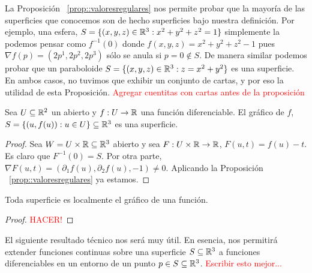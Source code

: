 \begin{ex}
La Proposición ~\ref{prop::valoresregulares} nos permite probar que la mayoría de las superficies que conocemos son de hecho superficies bajo nuestra definición. Por ejemplo, una esfera, $S=\{(x,y,z)\in\mathbb{R}^3 : x^2+y^2+z^2 =1\}$ simplemente la podemos pensar como $f^{-1}(0)$ donde $f(x,y,z)=x^2+y^2+z^2-1$ pues $\nabla f(p)=(2p^1,2p^2,2p^3)$ sólo se anula si $p=0\notin S$. De manera similar podemos probar que un paraboloide $S=\{(x,y,z)\in\mathbb{R}^3 : z = x^2+y^2\}$ es una superficie. En ambos casos, no tuvimos que exhibir un conjunto de cartas, y por eso la utilidad de esta Proposición. \textcolor{red}{Agregar cuentitas con cartas antes de la proposición}
\end{ex}

\begin{cor}
Sea $U\subseteq\mathbb{R}^2$ un abierto y $f:U\to\mathbb{R}$ una función diferenciable. El gráfico de $f$, $S=\{(u,f(u)) : u\in U\}\subseteq\mathbb{R}^3$ es una superficie.
\begin{proof}
Sea $W=U\times\mathbb{R}\subseteq\mathbb{R}^3$ abierto y sea $F:U\times\mathbb{R}\to\mathbb{R}$, $F(u,t)=f(u)-t$. Es claro que $F^{-1}(0)=S$. Por otra parte, $\nabla F(u,t)=(\partial_1f(u),\partial_2f(u),-1)\neq 0$. Aplicando la Proposición ~\ref{prop::valoresregulares} ya estamos.
\end{proof}
\end{cor}

\begin{cor}
Toda superficie es localmente el gráfico de una función.
\begin{proof}
\textcolor{red}{HACER!}
\end{proof}
\end{cor}

El siguiente resultado técnico nos será muy útil. En esencia, nos permitirá extender funciones continuas sobre una superficie $S\subseteq\mathbb{R}^3$ a funciones diferenciables en un entorno de un punto $p\in S\subseteq\mathbb{R}^3$. \textcolor{red}{Escribir esto mejor...}


